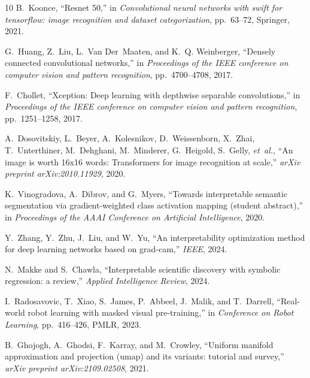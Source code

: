 \documentclass[final,5p,times,twocolumn]{elsarticle}
\begin{document}
\begin{thebibliography}{10}
B.~Koonce, ``Resnet 50,'' in {\em Convolutional neural networks with swift for tensorflow: image recognition and dataset categorization}, pp.~63--72, Springer, 2021.

G.~Huang, Z.~Liu, L.~Van Der~Maaten, and K.~Q. Weinberger, ``Densely connected convolutional networks,'' in {\em Proceedings of the IEEE conference on computer vision and pattern recognition}, pp.~4700--4708, 2017.

F.~Chollet, ``Xception: Deep learning with depthwise separable convolutions,'' in {\em Proceedings of the IEEE conference on computer vision and pattern recognition}, pp.~1251--1258, 2017.

A.~Dosovitskiy, L.~Beyer, A.~Kolesnikov, D.~Weissenborn, X.~Zhai, T.~Unterthiner, M.~Dehghani, M.~Minderer, G.~Heigold, S.~Gelly, {\em et~al.}, ``An image is worth 16x16 words: Transformers for image recognition at scale,'' {\em arXiv preprint arXiv:2010.11929}, 2020.

K.~Vinogradova, A.~Dibrov, and G.~Myers, ``Towards interpretable semantic segmentation via gradient-weighted class activation mapping (student abstract),'' in {\em Proceedings of the AAAI Conference on Artificial Intelligence}, 2020.

Y.~Zhang, Y.~Zhu, J.~Liu, and W.~Yu, ``An interpretability optimization method for deep learning networks based on grad-cam,'' {\em IEEE}, 2024.

N.~Makke and S.~Chawla, ``Interpretable scientific discovery with symbolic regression: a review,'' {\em Applied Intelligence Review}, 2024.

I.~Radosavovic, T.~Xiao, S.~James, P.~Abbeel, J.~Malik, and T.~Darrell, ``Real-world robot learning with masked visual pre-training,'' in {\em Conference on Robot Learning}, pp.~416--426, PMLR, 2023.

B.~Ghojogh, A.~Ghodsi, F.~Karray, and M.~Crowley, ``Uniform manifold approximation and projection (umap) and its variants: tutorial and survey,'' {\em arXiv preprint arXiv:2109.02508}, 2021.

\end{thebibliography}
\end{document}

